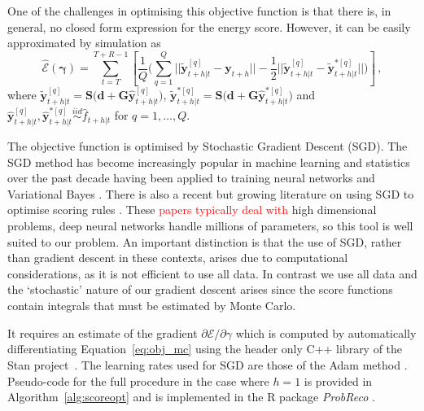 \documentclass[a4paper,12pt]{article}
\theoremstyle{definition}
\begin{document}
One of the challenges in optimising this objective function is that there is, in general, no closed form expression for the energy score. However, it can be easily approximated by simulation as
\begin{equation}
\hat{\mathcal{E}}\left(\bm{\gamma}\right)=\sum\limits_{t=T}^{T+R-1}\left[\frac{1}{Q}\bigg(\sum\limits_{q=1}^{Q}||\tilde{\bm{y}}^{[q]}_{t+h|t}-\bm{y}_{t+h}||-\frac{1}{2}||\tilde{\bm{y}}_{t+h|t}^{[q]}-\tilde{\bm{y}}^{*[q]}_{t+h|t}||\bigg)\right]\,,
\label{eq:obj_mc}
\end{equation}
where $\tilde{\bm{y}}^{[q]}_{t+h|t}=\bm{S}\big(\bm{d}+\bm{G}{\hat{\bm{y}}}^{[q]}_{t+h|t}\big)$, $\tilde{\bm{y}}^{*[q]}_{t+h|t}=\bm{S}\big(\bm{d}+\bm{G}{\hat{\bm{y}}}^{*[q]}_{t+h|t}\big)$ and ${\hat{\bm{y}}}^{[q]}_{t+h|t},{\hat{\bm{y}}}^{*[q]}_{t+h|t}\overset{iid}{\sim} \hat{f}_{t+h|t}$ for $q=1,\ldots,Q$.

The objective function is optimised by Stochastic Gradient Descent (SGD). The SGD method has become increasingly popular in machine learning and statistics over the past decade having been applied to training neural networks \citep{bottou2010} and Variational Bayes \citep{kingma2013}. There is also a recent but growing literature on using SGD to optimise scoring rules \citep[see][and references therein for examples]{GasEtAl2019,JanSte2020,HofEtAl2020}. These \textcolor{red}{papers typically deal with} high dimensional problems, deep neural networks handle millions of parameters, so this tool is well suited to our problem. {\color{red} An important distinction is that the use of SGD, rather than gradient descent in these contexts, arises due to computational considerations, as it is not efficient to use all data. In contrast we use all data and the `stochastic' nature of our gradient descent arises since the score functions contain integrals that must be estimated by Monte Carlo.}

It requires an estimate of the gradient $\partial\hat{\mathcal{E}}/\partial{\gamma}$ which is computed by automatically differentiating Equation~\eqref{eq:obj_mc} using the header only C++ library of the Stan project~\citep{carpenter2015}. The learning rates used for SGD are those of the Adam method \citep[see][for details]{kingma2014}. Pseudo-code for the full procedure in the case where $h=1$ is provided in Algorithm~\ref{alg:scoreopt} and is implemented in the R package \textit{ProbReco} \citep{RProbReco}.
\end{document}
